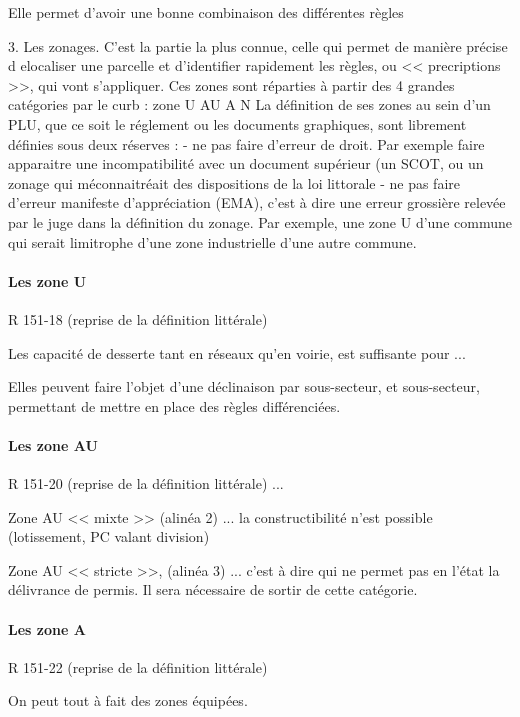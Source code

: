 		Elle permet d'avoir une bonne combinaison des différentes règles
		
		3. Les zonages. C'est la partie la plus connue, celle qui permet de manière précise d elocaliser une parcelle et d'identifier rapidement les règles, ou << precriptions >>, qui vont s'appliquer. Ces zones sont réparties à partir des 4 grandes catégories par le curb :
			zone U
			AU
			A
			N
		La définition de ses zones au sein d'un PLU, que ce soit le réglement ou les documents graphiques, sont librement définies sous deux réserves : 
			- ne pas faire d'erreur de droit. Par exemple faire apparaitre une incompatibilité avec un document supérieur (un SCOT, ou un zonage qui méconnaitréait des dispositions de la loi littorale
			- ne pas faire d'erreur manifeste d'appréciation (EMA), c'est à dire une erreur grossière relevée par le juge dans la définition du zonage. Par exemple, une zone U d'une commune qui serait limitrophe d'une zone industrielle d'une autre commune.
			
		\paragraph{Les zone U} R 151-18 (reprise de la définition littérale)
			
			Les capacité de desserte tant en réseaux qu'en voirie, est suffisante pour ...
			
			Elles peuvent faire l'objet d'une déclinaison par sous-secteur, et sous-secteur, permettant de mettre en place des règles différenciées.
			
		\paragraph{Les zone AU} R 151-20 (reprise de la définition littérale) ... 
		
			Zone AU << mixte >> (alinéa 2) ... la constructibilité n'est possible (lotissement, PC valant division)
			
			Zone AU << stricte >>, (alinéa 3) ... c'est à dire qui ne permet pas en l'état la délivrance de permis. Il sera nécessaire de sortir de cette catégorie.
		
		\paragraph{Les zone A} R 151-22 (reprise de la définition littérale)
		
			On peut tout à fait des zones équipées.
			

